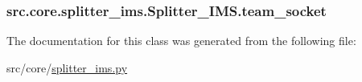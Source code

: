 \subsubsection[{team\+\_\+socket}]{\setlength{\rightskip}{0pt plus 5cm}src.\+core.\+splitter\+\_\+ims.\+Splitter\+\_\+\+I\+M\+S.\+team\+\_\+socket}\label{classsrc_1_1core_1_1splitter__ims_1_1Splitter__IMS_ae1bfe8aed522f33b9786764fbfa3e502}


The documentation for this class was generated from the following file\+:\begin{DoxyCompactItemize}
\item 
src/core/\hyperlink{splitter__ims_8py}{splitter\+\_\+ims.\+py}\end{DoxyCompactItemize}
